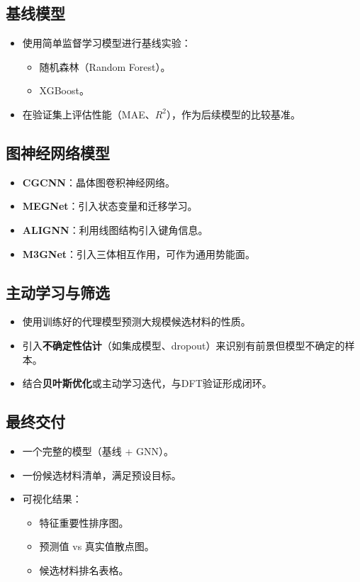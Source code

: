 \documentclass[12pt,a4paper]{article}
\begin{document}
\subsection{基线模型}
\begin{itemize}
    \item 使用简单监督学习模型进行基线实验：
    \begin{itemize}
        \item 随机森林（Random Forest）。
        \item XGBoost。
    \end{itemize}
    \item 在验证集上评估性能（MAE、$R^2$），作为后续模型的比较基准。
\end{itemize}

\subsection{图神经网络模型}
\begin{itemize}
    \item \textbf{CGCNN}：晶体图卷积神经网络。
    \item \textbf{MEGNet}：引入状态变量和迁移学习。
    \item \textbf{ALIGNN}：利用线图结构引入键角信息。
    \item \textbf{M3GNet}：引入三体相互作用，可作为通用势能面。
\end{itemize}

\subsection{主动学习与筛选}
\begin{itemize}
    \item 使用训练好的代理模型预测大规模候选材料的性质。
    \item 引入\textbf{不确定性估计}（如集成模型、dropout）来识别有前景但模型不确定的样本。
    \item 结合\textbf{贝叶斯优化}或主动学习迭代，与DFT验证形成闭环。
\end{itemize}

\subsection{最终交付}
\begin{itemize}
    \item 一个完整的模型（基线 + GNN）。
    \item 一份候选材料清单，满足预设目标。
    \item 可视化结果：
    \begin{itemize}
        \item 特征重要性排序图。
        \item 预测值 vs 真实值散点图。
        \item 候选材料排名表格。
    \end{itemize}
\end{itemize}
\end{document}
